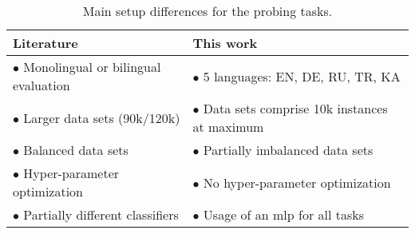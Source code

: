 \begin{table}[h]
	\centering
	\renewcommand{\arraystretch}{1.6}
	\begin{tabularx}{\textwidth}{| X | X |}
		\hline
		\rowcolor{tud9c!50}
		\textbf{Literature} & \textbf{This work}	\\
		\hline
		$\bullet$ Monolingual or bilingual evaluation 							&
		$\bullet$ 5 languages: EN, DE, RU, TR, KA 							\\
		$\bullet$ Larger data sets (90k/120k) 								&
		$\bullet$ Data sets comprise 10k instances at maximum					\\
		$\bullet$ Balanced data sets									&
		$\bullet$ Partially imbalanced data sets							\\
		$\bullet$ Hyper-parameter optimization							&
		$\bullet$ No hyper-parameter optimization							\\
		$\bullet$ Partially different classifiers								&
		$\bullet$ Usage of an \gls{mlp} for all tasks							\\
		\hline
	\end{tabularx}
	\caption[Main setup differences for the probing tasks]{Main setup differences for the probing tasks.}
	\label{tab:diff_setup}
\end{table}